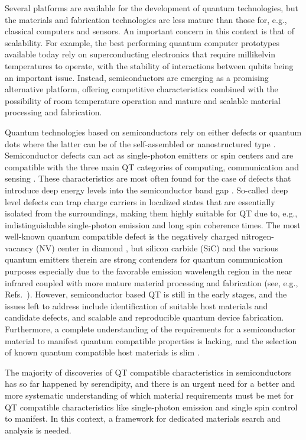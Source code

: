 \documentclass[superscriptaddress,
preprint,
 amsmath,amssymb,
 aps,
]{revtex4-2}
\begin{document}
Several platforms are available for the development of quantum technologies, but the materials and fabrication technologies are less mature than those for, e.g., classical computers and sensors. 
An important concern in this context is that of scalability. 
For example, the best performing quantum computer prototypes available today rely on superconducting electronics that require millikelvin temperatures to operate, with the stability of interactions between qubits being an important issue. Instead, semiconductors are emerging as a promising alternative platform, offering competitive characteristics combined with the possibility of room temperature operation and mature and scalable material processing and fabrication.  

Quantum technologies based on semiconductors rely on either defects or quantum dots where the latter can be of the self-assembled or nanostructured type \cite{Aharonovich_2016}. 
Semiconductor defects can act as single-photon emitters or spin centers and are compatible with the three main QT categories of computing, communication and sensing \cite{Awschalom_2018}. 
These characteristics are most often found for the case of defects that introduce deep energy levels into the semiconductor band gap \cite{Weber2010}. So-called deep level defects can trap charge carriers in localized states that are essentially isolated from the surroundings, making them highly suitable for QT due to, e.g., indistinguishable single-photon emission and long spin coherence times. 
The most well-known quantum compatible defect is the negatively charged nitrogen-vacancy (NV) center in diamond \cite{Doherty_2013}, but silicon carbide (SiC) and the various quantum emitters therein are strong contenders for quantum communication purposes especially due to the favorable emission wavelength region in the near infrared coupled with more mature material processing and fabrication (see, e.g., Refs.~\cite{Castelletto_2015,Son2020,Bathen2021}). However, semiconductor based QT is still in the early stages, and the issues left to address include identification of suitable host materials and candidate defects, and scalable and reproducible quantum device fabrication. 
Furthermore, a complete understanding of the requirements for a semiconductor material to manifest quantum compatible properties is lacking,  
and the selection of known quantum compatible host materials is slim \cite{Atatuere2018,Zhang2020}. 

The majority of discoveries of QT compatible characteristics in semiconductors has so far happened by serendipity, and there is an urgent need for a better and more systematic understanding of which material requirements must be met for QT compatible characteristics like single-photon emission and single spin control to manifest. In this context, a framework for dedicated materials search and analysis is needed. 
\end{document}
